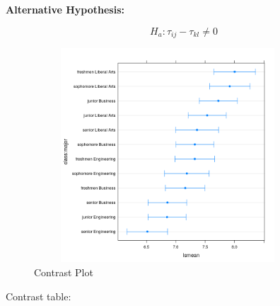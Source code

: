 \documentclass{article} %
\begin{document}
\textbf{Alternative Hypothesis:}

$$H_a :  \tau_{ij} - \tau_{kl} \neq 0$$


\begin{figure}[H]
	\begin{center}
		\includegraphics[height=8cm, width=10cm]{9.png}
	\end{center}
	\caption{Contrast Plot}
\end{figure}


Contrast table:
\end{document}
